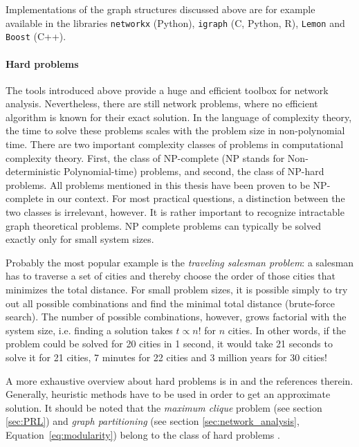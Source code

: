 Implementations of the graph structures discussed above are for example available in the libraries \verb"networkx" (Python), \verb"igraph" (C, Python, R), \verb"Lemon" and \verb"Boost" (C++).

\paragraph{Hard problems\color{Cayenne}{.}}
The tools introduced above provide a huge and efficient toolbox for network analysis.
Nevertheless, there are still network problems, where no efficient algorithm is known for their exact solution.
In the language of complexity theory, the time to solve these problems scales with the problem size in non-polynomial time.
There are two important complexity classes of problems in computational complexity theory.
First, the class of NP-complete (NP stands for Non-deterministic Polynomial-time) problems, and second, the class of NP-hard problems.
All problems mentioned in this thesis have been proven to be NP-complete in our context.
For most practical questions, a distinction between the two classes is irrelevant, however.
It is rather important to recognize intractable graph theoretical problems.
NP complete problems can typically be solved exactly only for small system sizes.

Probably the most popular example is the \emph{traveling salesman problem}: a salesman has to traverse a set of cities and thereby choose the order of those cities that minimizes the total distance.
For small problem sizes, it is possible simply to try out all possible combinations and find the minimal total distance (brute-force search).
The number of possible combinations, however, grows factorial with the system size, i.e. finding a solution takes $t\propto n!$ for $n$ cities.
In other words, if the problem could be solved for 20 cities in 1 second, it would take 21 seconds to solve it for 21 cities, 7 minutes for 22 cities and 3 million years for 30 cities!

A more exhaustive overview about hard problems is in \citep{algorithm_design} and the references therein.
Generally, heuristic methods have to be used in order to get an approximate solution.
It should be noted that the \emph{maximum clique} problem (see section \ref{sec:PRL}) and \emph{graph partitioning} (see section \ref{sec:network_analysis}, Equation~\eqref{eq:modularity}) belong to the class of hard problems \citep{brandes2007}.

